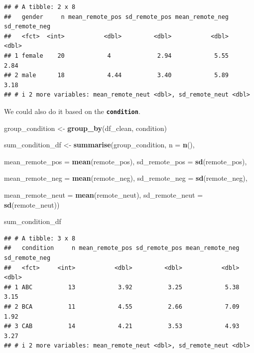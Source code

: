 \documentclass[
]{book}
\newenvironment{Shaded}{\begin{snugshade}}{\end{snugshade}}
\newcommand{\AttributeTok}[1]{\textcolor[rgb]{0.13,0.29,0.53}{#1}}
\newcommand{\FunctionTok}[1]{\textcolor[rgb]{0.13,0.29,0.53}{\textbf{#1}}}
\newcommand{\NormalTok}[1]{#1}
\newcommand{\OtherTok}[1]{\textcolor[rgb]{0.56,0.35,0.01}{#1}}
\begin{document}
\begin{verbatim}
## # A tibble: 2 x 8
##   gender     n mean_remote_pos sd_remote_pos mean_remote_neg sd_remote_neg
##   <fct>  <int>           <dbl>         <dbl>           <dbl>         <dbl>
## 1 female    20            4             2.94            5.55          2.84
## 2 male      18            4.44          3.40            5.89          3.18
## # i 2 more variables: mean_remote_neut <dbl>, sd_remote_neut <dbl>
\end{verbatim}

We could also do it based on the \textbf{\texttt{condition}}.

\begin{Shaded}
\begin{Highlighting}[]
\NormalTok{group\_condition }\OtherTok{\textless{}{-}} \FunctionTok{group\_by}\NormalTok{(df\_clean, condition)}

\NormalTok{sum\_condition\_df }\OtherTok{\textless{}{-}} \FunctionTok{summarise}\NormalTok{(group\_condition, }
                        \AttributeTok{n =} \FunctionTok{n}\NormalTok{(), }
                        
                        \AttributeTok{mean\_remote\_pos =} \FunctionTok{mean}\NormalTok{(remote\_pos),}
                        \AttributeTok{sd\_remote\_pos =} \FunctionTok{sd}\NormalTok{(remote\_pos),}
          
                        \AttributeTok{mean\_remote\_neg =} \FunctionTok{mean}\NormalTok{(remote\_neg),}
                        \AttributeTok{sd\_remote\_neg =} \FunctionTok{sd}\NormalTok{(remote\_neg),}
          
                        \AttributeTok{mean\_remote\_neut =} \FunctionTok{mean}\NormalTok{(remote\_neut),}
                        \AttributeTok{sd\_remote\_neut =} \FunctionTok{sd}\NormalTok{(remote\_neut))}

\NormalTok{sum\_condition\_df}
\end{Highlighting}
\end{Shaded}

\begin{verbatim}
## # A tibble: 3 x 8
##   condition     n mean_remote_pos sd_remote_pos mean_remote_neg sd_remote_neg
##   <fct>     <int>           <dbl>         <dbl>           <dbl>         <dbl>
## 1 ABC          13            3.92          3.25            5.38          3.15
## 2 BCA          11            4.55          2.66            7.09          1.92
## 3 CAB          14            4.21          3.53            4.93          3.27
## # i 2 more variables: mean_remote_neut <dbl>, sd_remote_neut <dbl>
\end{verbatim}
\end{document}
